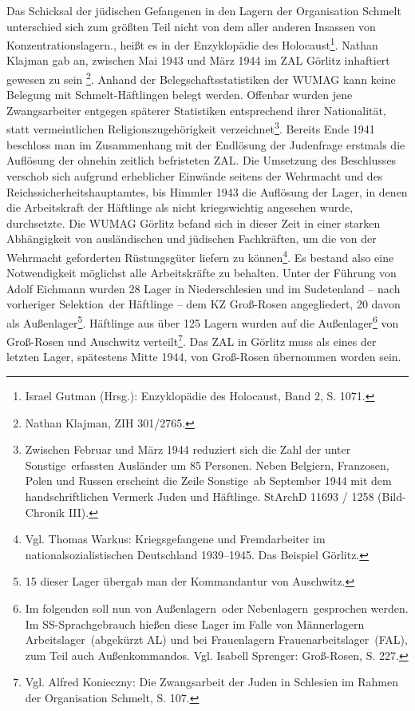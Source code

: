 \glqq Das Schicksal der jüdischen Gefangenen in den Lagern der Organisation Schmelt unterschied sich zum größten Teil nicht von dem aller anderen Insassen von Konzentrationslagern.\grqq, heißt es in der Enzyklopädie des Holocaust\footnote{Israel Gutman (Hrsg.): Enzyklopädie des Holocaust, Band 2, S. 1071.}.
\newline
Nathan Klajman gab an, zwischen Mai 1943 und März 1944 im ZAL Görlitz inhaftiert gewesen zu sein
\footnote{Nathan Klajman, ZIH 301/2765.}. Anhand der Belegschaftsstatistiken der WUMAG kann keine Belegung mit Schmelt-Häftlingen belegt werden. Offenbar wurden jene Zwangsarbeiter entgegen späterer Statistiken entsprechend ihrer Nationalität, statt vermeintlichen Religionszugehörigkeit verzeichnet\footnote{Zwischen Februar und März 1944 reduziert sich die Zahl der unter \glqq Sonstige\grqq~erfassten Ausländer um 85 Personen. Neben Belgiern, Franzosen, Polen und Russen erscheint die Zeile \glqq Sonstige\grqq~ab September 1944 mit dem handschriftlichen Vermerk \glqq Juden und Häftlinge\grqq. StArchD 11693 / 1258 (Bild-Chronik III).}.
\newline
Bereits Ende 1941 beschloss man im Zusammenhang mit der Endlösung der Judenfrage erstmals die Auflösung der ohnehin zeitlich befristeten ZAL. Die Umsetzung des Beschlusses verschob sich aufgrund erheblicher Einwände seitens der Wehrmacht und des Reichssicherheitshauptamtes, bis Himmler 1943 die Auflösung der Lager, in denen die Arbeitskraft der Häftlinge als nicht kriegswichtig angesehen wurde, durchsetzte. Die WUMAG Görlitz befand sich in dieser Zeit in einer starken Abhängigkeit von ausländischen und jüdischen Fachkräften, um die von der Wehrmacht geforderten Rüstungsgüter liefern zu können\footnote{Vgl. Thomas Warkus: Kriegsgefangene und Fremdarbeiter im nationalsozialistischen Deutschland 1939--1945. Das Beispiel Görlitz.}. Es bestand also eine Notwendigkeit möglichst alle Arbeitskräfte zu behalten.
Unter der Führung von Adolf Eichmann wurden 28 Lager in Niederschlesien und im Sudetenland -- nach vorheriger \glqq Selektion\grqq~der Häftlinge -- dem KZ Groß-Rosen angegliedert, 20 davon als Außenlager\footnote{15 dieser Lager übergab man der Kommandantur von Auschwitz.}. Häftlinge aus über 125 Lagern wurden auf die Außenlager\footnote{Im folgenden soll nun von \glqq Außenlagern\grqq~oder \glqq Nebenlagern\grqq~gesprochen werden. Im SS-Sprachgebrauch hießen diese Lager im Falle von Männerlagern \glqq Arbeitslager\grqq~(abgekürzt AL) und bei Frauenlagern \glqq Frauenarbeitslager\grqq~(FAL), zum Teil auch \glqq Außenkommandos\grqq. Vgl. Isabell Sprenger: Groß-Rosen, S. 227.} von Groß-Rosen und Auschwitz verteilt\footnote{Vgl. Alfred Konieczny: Die Zwangsarbeit der Juden in Schlesien im Rahmen der Organisation Schmelt, S. 107.}. Das ZAL in Görlitz muss als eines der letzten Lager, spätestens Mitte 1944, von Groß-Rosen übernommen worden sein.


